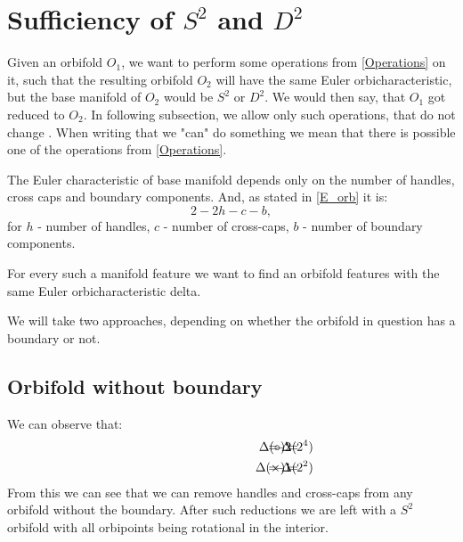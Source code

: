 \section{Sufficiency of $S^2$ and $D^2$}\label{sufficiency of D2 and S2}

Given an orbifold $O_1$, we want to perform some operations from \ref{Operations} on it, 
such that the resulting orbifold 
$O_2$ will have the same Euler orbicharacteristic, but the base manifold of $O_2$ would 
be $S^2$ or $D^2$. We would then say, that $O_1$ got reduced to $O_2$.
In following subsection, we allow only such operations, that do not 
change \Eoc. When writing that we "can" do something we mean that there is 
possible one of the operations from \ref{Operations}.  %

The Euler characteristic of base manifold depends only on the number of handles, cross caps 
and boundary components. And, as stated in \ref{E_orb} it is: 
\begin{equation}
2-2h-c-b,
\end{equation}
for $h$ - number of handles, $c$ - number of cross-caps, $b$ - number of boundary components. 

For every such a manifold feature we want to find an orbifold features with the same 
Euler orbicharacteristic delta. 

We will take two approaches, depending on whether the orbifold in question has a boundary or not.

\subsection{Orbifold without boundary}
We can observe that:
\begin{align}
\hspace{3cm}\Delta(\circ) =& \hspace{-1cm} &-2& \hspace{-1cm} &= \Delta(2^4) \\
\hspace{3cm}\Delta(\times) =& \hspace{-1cm} &-1& \hspace{-1cm} &= \Delta(2^2)
\end{align}
From this we can see that we can remove handles and cross-caps from any orbifold without 
the boundary. 
After such reductions we are left with a $S^2$ orbifold with all orbipoints being rotational 
in the interior.

